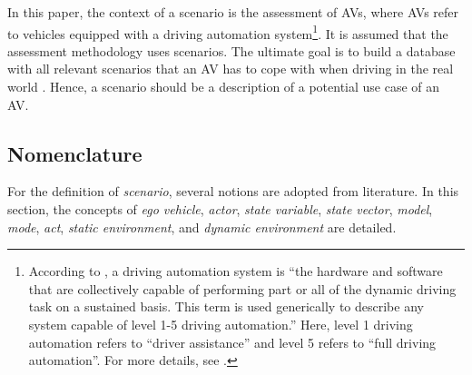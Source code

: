 In this paper, the context of a scenario is the assessment of AVs, where AVs refer to vehicles equipped with a driving automation system\footnote{According to \autocite{sae2018j3016}, a driving automation system is ``the hardware and software that are collectively capable of performing part or all of the dynamic driving task on a sustained basis. This term is used generically to describe any system capable of level 1-5 driving automation.'' Here, level 1 driving automation refers to ``driver assistance'' and level 5 refers to ``full driving automation''. For more details, see \autocite{sae2018j3016}.}. 
It is assumed that the assessment methodology uses scenarios. %
The ultimate goal is to build a database with all relevant scenarios that an AV has to cope with when driving in the real world \autocite{putz2017pegasus}. Hence, a scenario should be a description of a potential use case of an AV. 




\subsection{Nomenclature}
\label{sec:nomenclature}

For the definition of \emph{scenario}, several notions are adopted from literature. In this section, the concepts of \emph{ego vehicle}, \emph{actor}, \cstart \emph{state variable}, \emph{state vector}\cend, \emph{model}, \emph{mode}, \emph{act}, \emph{static environment}, and \emph{dynamic environment} are detailed. 

